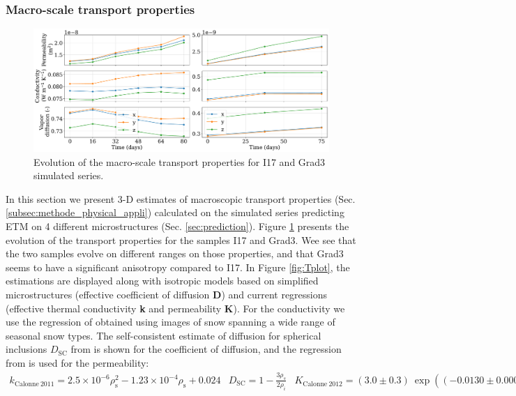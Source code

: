 \documentclass[draft,ms]{agujournal2019}
\begin{document}
\subsubsection{Macro-scale transport properties}

\begin{figure}
    \centering
    \includegraphics[width=\linewidth]{Figures/4images_transport_temps_court.pdf}
    \caption{Evolution of the macro-scale transport properties for I17 and Grad3 simulated series.}
    \label{fig:transport_temps}
\end{figure}

In this section we present 3-D estimates of macroscopic transport properties (Sec. \ref{subsec:methode_physical_appli}) calculated on the simulated series predicting ETM on 4 different microstructures (Sec. \ref{sec:prediction}). Figure \ref{fig:transport_temps} presents the evolution of the transport properties for the samples I17 and Grad3. Wee see that the two samples evolve on different ranges on those properties, and that Grad3 seems to have a significant anisotropy compared to I17.
In Figure \ref{fig:Tplot}, the estimations are displayed along with isotropic models based on simplified microstructures (effective coefficient of diffusion \textbf{D}) and current regressions (effective thermal conductivity \textbf{k} and permeability \textbf{K}). For the conductivity we use the regression of  obtained using images of snow spanning a wide range of seasonal snow types. The self-consistent estimate of diffusion for spherical inclusions $D_{\mathrm{SC}}$ from  is shown for the coefficient of diffusion, and the regression from  is used for the permeability: \\
\begin{subequations}
\begin{align}
k_{\mathrm{Calonne\ 2011}}=2.5 \times 10^{-6} \rho_{\mathrm{s}}^{2}-1.23 \times 10^{-4} \rho_{\mathrm{s}}+0.024\end{align}
\begin{align}
D_{\mathrm{SC}} = 1 - \frac{3\rho_s}{2\rho_i}
\end{align}
\begin{align}
K_{\mathrm{Calonne\ 2012}}=(3.0 \pm 0.3)\ \exp \left(\left(-0.0130 \pm 0.0003\right) \rho_{\mathrm{s}}\right)
\end{align}
\end{subequations}
\end{document}
